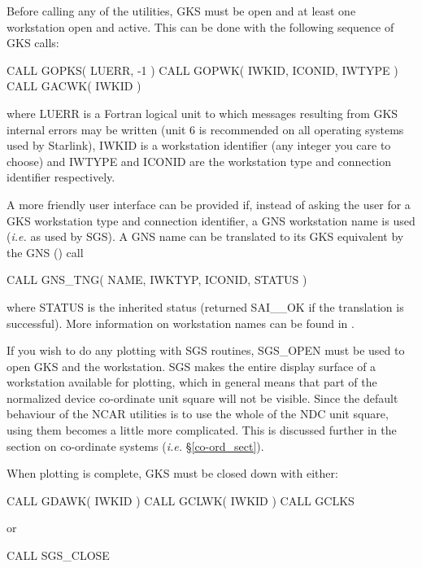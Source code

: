 \documentclass[twoside,11pt,nolof,noabs]{starlink}
\begin{document}
Before calling any of the utilities, GKS must be open and at least one
workstation open and active. 
This can be done with the following sequence of GKS calls:

\begin{terminalv}
      CALL GOPKS( LUERR, -1 )
      CALL GOPWK( IWKID, ICONID, IWTYPE )
      CALL GACWK( IWKID )
\end{terminalv}

where LUERR is a Fortran logical unit to which messages resulting from
GKS internal errors may be written (unit 6 is recommended on all operating
systems used by Starlink), IWKID is a workstation identifier (any integer you
care to choose) and IWTYPE and ICONID are the workstation type and connection
identifier respectively.

A more friendly user interface can be provided if, instead of asking the
user for a GKS workstation type and connection identifier, a GNS workstation
name is used (\emph{i.e.} as used by SGS).
A GNS name can be translated to its GKS equivalent by the GNS () call

\begin{terminalv}
      CALL GNS_TNG( NAME, IWKTYP, ICONID, STATUS )
\end{terminalv}

where STATUS is the inherited status (returned SAI\_\_OK if the translation is 
successful). 
More information on workstation names can be found in .

If you wish to do any plotting with SGS routines, SGS\_OPEN must be used to
open GKS and the workstation.
SGS makes the entire display surface of a workstation available for plotting,
which in general means that part of the normalized device co-ordinate unit
square will not be visible.
Since the default behaviour of the NCAR utilities is to use the whole of the
NDC unit square, using them becomes a little more complicated.
This is discussed further in the section on co-ordinate systems
(\emph{i.e.} \S\ref{co-ord_sect}).

When plotting is complete, GKS must be closed down with either:

\begin{terminalv}
      CALL GDAWK( IWKID )
      CALL GCLWK( IWKID )
      CALL GCLKS
\end{terminalv}

or

\begin{terminalv}
      CALL SGS_CLOSE
\end{terminalv}
\end{document}

